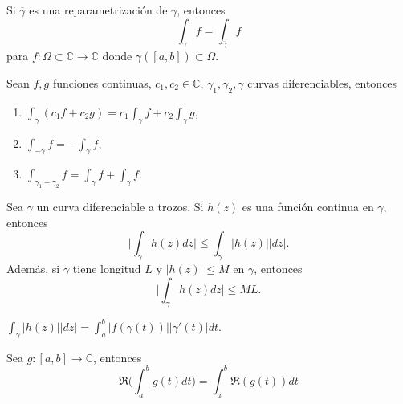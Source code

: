 \begin{prop}
  Si $\overline{\gamma}$ es una reparametrización de $\gamma$, entonces
  \[ 
    \int_{\gamma}^{} f = \int_{\overline{\gamma}}^{} f 
  \] 
  para $f: \Omega \subset \mathbb{C} \to \mathbb{C}$ donde $ \gamma([a, b]) \subset \Omega$.
\end{prop}

\begin{prop}
  Sean $f,g$ funciones continuas, $c_{1}, c_{2} \in \mathbb{C}$, $\gamma_{1}, \gamma_{2}, \gamma$ curvas diferenciables, entonces
  \begin{enumerate}[label=(\roman*)]
    \item $\int_{\gamma}^{} (c_{1} f + c_{2} g) = c_{1} \int_{\gamma}^{} f + c_{2} \int_{\gamma}^{}  g$,
    \item $\int_{-\gamma}^{} f = - \int_{\gamma}^{} f$,
    \item $\int_{\gamma_{1} + \gamma_{2}}^{} f = \int_{\gamma}^{} f + \int_{\gamma}^{} f$.
  \end{enumerate}
\end{prop}

\begin{theo}
  Sea $\gamma$ un curva diferenciable a trozos. Si $h(z)$ es una función continua en $\gamma$, entonces
  \[ 
    \Big | \int_{\gamma}^{} h(z) dz \Big | \leq \int_{\gamma}^{} | h(z) | | dz | .
  \] 
  Además, si $\gamma$ tiene longitud $L$ y $| h(z) | \leq M$ en $\gamma$, entonces
  \[ 
    \Big | \int_{\gamma}^{} h(z) dz \Big | \leq ML .
  \] 
\end{theo}

\begin{obs}
  $\int_{\gamma}^{} | h(z) | | dz | = \int_{a}^{b} | f(\gamma(t)) || \gamma'(t) | dt.$ 
\end{obs}

\begin{dem}
  Sea $g: [a, b] \to \mathbb{C}$, entonces
  \[ 
    \Re \Bigg ( \int_{a}^{b} g(t) dt \Bigg ) = \int_{a}^{b} \Re (g(t)) dt 
  \] 
\end{dem}
